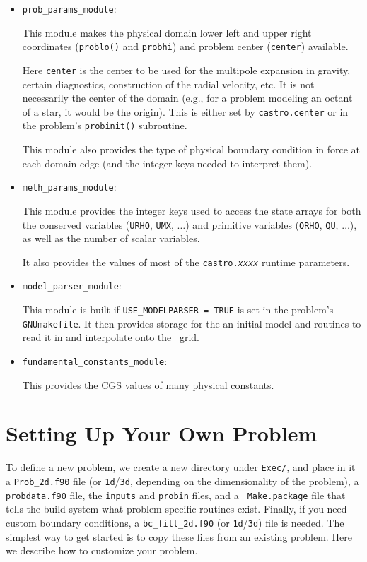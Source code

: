 \begin{itemize}
\item {\tt prob\_params\_module}:

  This module makes the physical domain lower left and upper right
  coordinates ({\tt problo()} and {\tt probhi}) and problem center
  ({\tt center}) available.

  Here {\tt center} is the center to
  be used for the multipole expansion in gravity, certain diagnostics,
  construction of the radial velocity, etc.  It is not necessarily
  the center of the domain (e.g., for a problem modeling an octant
  of a star, it would be the origin).  This is either set by
  {\tt castro.center} or in the problem's {\tt probinit()}
  subroutine.

  This module also provides the type of physical boundary
  condition in force at each domain edge (and the integer
  keys needed to interpret them).

\item {\tt meth\_params\_module}:

  This module provides the integer keys used to access the state
  arrays for both the conserved variables ({\tt URHO}, {\tt UMX}, $\ldots$)
  and primitive variables ({\tt QRHO}, {\tt QU}, $\ldots$), as well
  as the number of scalar variables.

  It also provides the values of most of the {\tt castro.{\em xxxx}}
  runtime parameters.

\item {\tt model\_parser\_module}:

  This module is built if {\tt USE\_MODELPARSER = TRUE} is set in the
  problem's {\tt GNUmakefile}.  It then provides storage for the an
  initial model and routines to read it in and interpolate onto the
  \castro\ grid.

\item {\tt fundamental\_constants\_module}:

  This provides the CGS values of many physical constants.
  
\end{itemize}

  

\section{Setting Up Your Own Problem}

To define a new problem, we create a new directory under {\tt Exec/},
and place in it a {\tt Prob\_2d.f90} file (or {\tt 1d}/{\tt 3d},
depending on the dimensionality of the problem), a {\tt probdata.f90}
file, the {\tt inputs} and {\tt probin} files, and a {\tt
  Make.package} file that tells the build system what problem-specific
routines exist.  Finally, if you need custom boundary conditions, a
{\tt bc\_fill\_2d.f90} (or {\tt 1d}/{\tt 3d}) file is needed.  The
simplest way to get started is to copy these files from an existing
problem.  Here we describe how to customize your problem.

